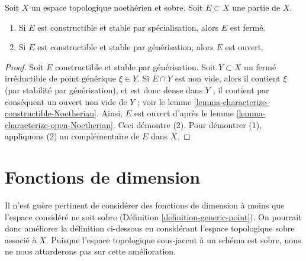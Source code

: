 \begin{lemma}
\label{lemma-characterize-closed-Noetherian}
Soit $X$ un espace topologique noethérien et sobre.
Soit $E \subset X$ une partie de $X$.
\begin{enumerate}
\item Si $E$ est constructible et stable par spécialisation, alors $E$ est
fermé.
\item Si $E$ est constructible et stable par générisation, alors $E$ est
ouvert.
\end{enumerate}
\end{lemma}

\begin{proof}
Soit $E$ constructible et stable par générisation.
Soit $Y \subset X$ un fermé irréductible de point générique $\xi \in Y$.
Si $E \cap Y$ est non vide, alors il contient $\xi$ (par stabilité par
générisation), et est donc dense dans $Y$ ; il contient par conséquent un
ouvert non vide de $Y$ ; voir le
lemme \ref{lemma-characterize-constructible-Noetherian}.
Ainsi, $E$ est ouvert d'après le
lemme \ref{lemma-characterize-open-Noetherian}.
Ceci démontre (2). Pour démontrer (1), appliquons (2) au complémentaire de $E$
dans $X$.
\end{proof}









\section{Fonctions de dimension}
\label{section-dimension-function}

\noindent
Il n'est guère pertinent de considérer des fonctions de dimension à moins que
l'espace considéré ne soit sobre (Définition \ref{definition-generic-point}).
On pourrait donc améliorer la définition ci-dessous en considérant l'espace
topologique sobre associé à $X$. Puisque l'espace topologique sous-jacent à un
schéma est sobre, nous ne nous attarderons pas sur cette amélioration.

